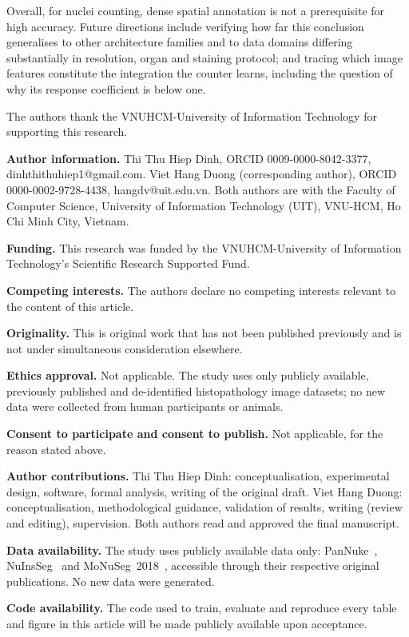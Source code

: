 \documentclass[pdflatex,sn-mathphys-num]{sn-jnl}
\begin{document}
Overall, for nuclei counting, dense spatial annotation is not a prerequisite for high accuracy. Future
directions include verifying how far this conclusion generalises to other architecture families and to data
domains differing substantially in resolution, organ and staining protocol; and tracing which image features
constitute the integration the counter learns, including the question of why its response coefficient is below
one.

\backmatter

The authors thank the VNUHCM-University of Information Technology for supporting this research.


\textbf{Author information.} Thi Thu Hiep Dinh, ORCID 0009-0000-8042-3377, dinhthithuhiep1@gmail.com.
Viet Hang Duong (corresponding author), ORCID 0000-0002-9728-4438, hangdv@uit.edu.vn. Both authors are with
the Faculty of Computer Science, University of Information Technology (UIT), VNU-HCM, Ho Chi Minh City,
Vietnam.

\textbf{Funding.} This research was funded by the VNUHCM-University of Information Technology's Scientific
Research Supported Fund.

\textbf{Competing interests.} The authors declare no competing interests relevant to the content of this
article.

\textbf{Originality.} This is original work that has not been published previously and is not under
simultaneous consideration elsewhere.

\textbf{Ethics approval.} Not applicable. The study uses only publicly available, previously published and
de-identified histopathology image datasets; no new data were collected from human participants or animals.

\textbf{Consent to participate and consent to publish.} Not applicable, for the reason stated above.

\textbf{Author contributions.} Thi Thu Hiep Dinh: conceptualisation, experimental design, software, formal
analysis, writing of the original draft. Viet Hang Duong: conceptualisation, methodological guidance,
validation of results, writing (review and editing), supervision. Both authors read and approved the final
manuscript.

\textbf{Data availability.} The study uses publicly available data only: PanNuke~\cite{pannuke},
NuInsSeg~\cite{nuinsseg} and MoNuSeg~2018~\cite{monuseg}, accessible through their respective original
publications. No new data were generated.

\textbf{Code availability.} The code used to train, evaluate and reproduce every table and figure in this
article will be made publicly available upon acceptance.


\end{document}
